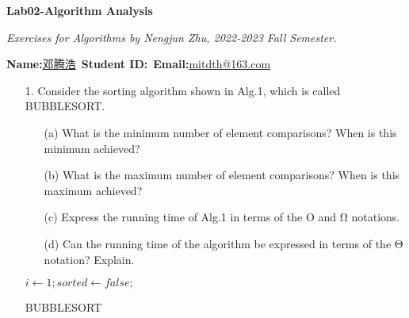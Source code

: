 \documentclass{article}
\begin{document}

\begin{center}
{\huge \textbf{Lab02-Algorithm Analysis}}

\textit{Exercises for Algorithms by Nengjun Zhu, 2022-2023 Fall Semester.}

\vspace{1em}
\textbf{Name:}\underline{\qquad 邓腾浩\qquad}\, \textbf{Student ID:}\underline{\qquad}\, \textbf{Email:}\underline{\qquad mitdth@163.com\qquad}
\end{center}

\begin{itemize}
\item[1.] {\large Consider the sorting algorithm shown in Alg.1, which is called BUBBLESORT.}
\begin{itemize}
\item[(a)] What is the minimum number of element comparisons? When is this minimum achieved?
\item[(b)] What is the maximum number of element comparisons? When is this maximum achieved?
\item[(c)] Express the running time of Alg.1 in terms of the Ο and Ω notations.
\item[(d)] Can the running time of the algorithm be expressed in terms of the Θ notation? Explain.
\end{itemize}

\begin{minipage}{10cm}
\IncMargin{1em} %
\begin{algorithm}[H] 

    \BlankLine

    $i \leftarrow 1; sorted \leftarrow false;$\\
    \caption{BUBBLESORT}
\end{algorithm}
\DecMargin{1em}
\end{minipage}


\end{itemize}
\end{document}
